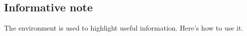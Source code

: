 \documentclass[10pt, a4paper]{article}
\begin{document}
\subsection{Informative note}

The  environment is used to highlight useful information. Here's how to use it.

\end{document}
